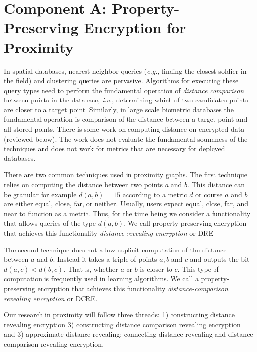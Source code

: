 
\section{Component A:  Property-Preserving Encryption for Proximity}

In spatial databases, nearest neighbor queries (\emph{e.g.}, finding the closest soldier in the field) and clustering queries are pervasive.  Algorithms for executing these query types need to perform the fundamental operation of \emph{distance comparison} between points in the database, \emph{i.e.}, determining which of two candidates points are closer to a target point.  Similarly, in large scale biometric databases the fundamental operation is comparison of the distance between a target point and all stored points.   There is some work on computing distance on encrypted data (reviewed below).  The work does not evaluate the fundamental soundness of the techniques and does not work for metrics that are necessary for deployed databases.

There are two common techniques used in proximity graphs.  The first technique relies on computing the distance between two points $a$ and $b$.  This distance can be granular for example $d(a, b) =15$ according to a metric $d$ or course $a$ and $b$ are either equal, close, far, or neither.  Usually, users expect equal, close, far, and near to function as a metric.  Thus, for the time being we consider a functionality that allows queries of the type $d(a,b)$.  We call property-preserving encryption that achieves this functionality \emph{distance revealing encryption} or DRE.

The second technique does not allow explicit computation of the distance between $a$ and $b$.  Instead it takes a triple of points $a,b$ and $c$ and outputs the bit $d(a,c)<d(b,c)$.  That is, whether $a$ or $b$ is closer to $c$.  This type of computation is frequently used in learning algorithms.    We call a property-preserving encryption that achieves this functionality \emph{distance-comparison revealing encryption} or DCRE.

Our research in proximity will follow three threads: 1) constructing distance revealing encryption 3) constructing distance comparison revealing encryption and 3) approximate distance revealing: connecting distance revealing and distance comparison revealing encryption.

